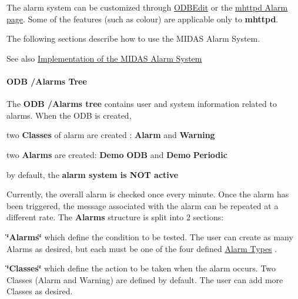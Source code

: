 The alarm system can be customized through \hyperlink{RC_odbedit_utility}{ODBEdit} or the \hyperlink{RC_mhttpd_ODB_page}{mhttpd Alarm page}. Some of the features (such as colour) are applicable only to {\bfseries mhttpd}.

The following sections describe how to use the MIDAS Alarm System.

See also \hyperlink{RC_customize_ODB_RC_ODB_Alarm_system_implementation}{Implementation of the MIDAS Alarm System}

\label{RC_customize_ODB_idx_alarm_classes}
\hypertarget{RC_customize_ODB_idx_alarm_classes}{}
 \label{RC_customize_ODB_idx_alarm_type}
\hypertarget{RC_customize_ODB_idx_alarm_type}{}
 \label{RC_customize_ODB_idx_ODB_tree_Alarms}
\hypertarget{RC_customize_ODB_idx_ODB_tree_Alarms}{}
 \label{RC_customize_ODB_RC_alarm_classes}
\hypertarget{RC_customize_ODB_RC_alarm_classes}{}
 \label{RC_customize_ODB_RC_alarm_type}
\hypertarget{RC_customize_ODB_RC_alarm_type}{}
 

 \hypertarget{RC_customize_ODB_RC_ODB_Alarms_Tree}{}\paragraph{ODB /Alarms Tree}\label{RC_customize_ODB_RC_ODB_Alarms_Tree}
The {\bfseries  ODB /Alarms tree } contains user and system information related to alarms. When the ODB is created,
\begin{DoxyItemize}
\item two {\bfseries Classes} of alarm are created : {\bfseries Alarm} and {\bfseries Warning} 
\item two {\bfseries Alarms} are created: {\bfseries Demo} {\bfseries ODB} and {\bfseries Demo} {\bfseries Periodic} 
\item by default, the {\bfseries alarm system is NOT active}
\end{DoxyItemize}

Currently, the overall alarm is checked once every minute. Once the alarm has been triggered, the message associated with the alarm can be repeated at a different rate. The {\bfseries Alarms} structure is split into 2 sections:
\begin{DoxyItemize}
\item {\bfseries \char`\"{}Alarms\char`\"{}} which define the condition to be tested. The user can create as many Alarms as desired, but each must be one of the four defined \hyperlink{RC_customize_ODB_RC_alarm_types}{Alarm Types} .
\item {\bfseries \char`\"{}Classes\char`\"{}} which define the action to be taken when the alarm occurs. Two Classes (Alarm and Warning) are defined by default. The user can add more Classes as desired.
\end{DoxyItemize}

